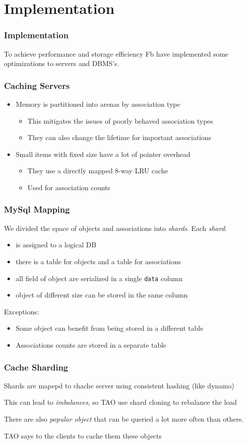 \section{Implementation}
\begin{frame}
\frametitle{Implementation}
To achieve performance and storage efficiency Fb have implemented some optimizations to servers and DBMS's. 
\end{frame}

\begin{frame}[c]\frametitle{Caching Servers}
\begin{itemize}
	\item Memory is partitioned into arenas by association type
	\begin{itemize}
		\item This mitigates the issues of poorly behaved association types
		\item They can also change the lifetime for important associations
	\end{itemize}
	\item Small items with fixed size have a lot of pointer overhead
	\begin{itemize}
		\item They use a directly mapped 8-way LRU cache
		\item Used for association counts
	\end{itemize}
\end{itemize}    
\end{frame}

\begin{frame}[fragile]\frametitle{MySql Mapping}
    We divided the space of objects and associations into \emph{shards}. Each \emph{shard}:
    \begin{itemize}
    	\item is assigned to a logical DB
    	\item there is a table for objects and a table for associations
    	\item all field of object are serialized in a single \verb!data! column
    	\item object of different size can be stored in the same column
    \end{itemize}
Exceptions:
\begin{itemize}
	\item Some object can benefit from being stored in a different table
	\item Associations counts are stored in a separate table
\end{itemize}
\end{frame}

\begin{frame}[c]\frametitle{Cache Sharding}
    Shards are mapepd to chache server using consistent hashing (like dynamo)

    This can lead to \emph{imbalances}, so TAO use shard cloning to rebalance the load

    There are also \emph{popular object} that can be queried a lot more often than others.

    TAO says to the clients to cache them these objects
\end{frame}